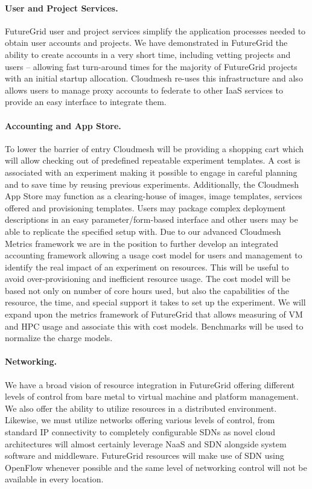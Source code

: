 \documentclass[graybox]{svmult}
\begin{document}
\paragraph{User and Project Services.}


FutureGrid user and project services simplify the application processes needed to obtain user accounts and projects. We have demonstrated in FutureGrid the ability to create accounts in a very short time, including vetting projects and users – allowing fast turn-around times for the majority of FutureGrid projects with an initial startup allocation. Cloudmesh re-uses this infrastructure and also allows users to manage proxy accounts to federate to other IaaS services to provide an easy interface to integrate them.


\paragraph{Accounting and App Store.}


To lower the barrier of entry Cloudmesh will be providing a shopping cart which will allow checking out of predefined repeatable experiment templates. A cost is associated with an experiment making it possible to engage in careful planning and to save time by reusing previous experiments. Additionally, the Cloudmesh App Store may function as a clearing-house of images, image templates, services offered and provisioning templates. Users may package complex deployment descriptions in an easy parameter/form-based interface and other users may be able to replicate the specified setup with.
Due to our advanced Cloudmesh Metrics framework we are in the position to further develop an integrated accounting framework allowing a usage cost model for users and management to identify the real impact of an experiment on resources. This will be useful to avoid over-provisioning and inefficient resource usage. The cost model will be based not only on number of core hours used, but also the capabilities of the resource, the time, and special support it takes to set up the experiment. We will expand upon the metrics framework of FutureGrid that allows measuring of VM and HPC usage and associate this with cost models. Benchmarks will be used to normalize the charge models.


\paragraph{Networking.}


We have a broad vision of resource integration in FutureGrid offering different levels of control from bare metal to virtual machine and platform management. We also offer the ability to utilize resources in a distributed environment. Likewise, we must utilize networks offering various levels of control, from standard IP connectivity to completely configurable SDNs as novel cloud architectures will almost certainly leverage NaaS and SDN alongside system software and middleware. FutureGrid resources will make use of SDN using OpenFlow whenever possible and the same level of networking control will not be available in every location. 
\end{document}
